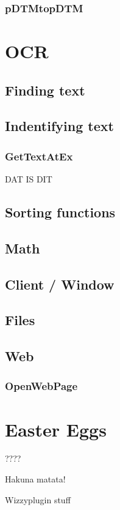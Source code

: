 \documentclass[a4paper]{report}
\begin{document}
\subsection{pDTMtopDTM}


\chapter{OCR}

\section{Finding text}

\section{Indentifying text}

\subsection{GetTextAtEx}
DAT IS DIT

\section{Sorting functions}

\section{Math}

\section{Client / Window}

\section{Files}

\section{Web}
\subsection{OpenWebPage}

\chapter{Easter Eggs}
????

Hakuna matata!

Wizzyplugin stuff
\end{document}
